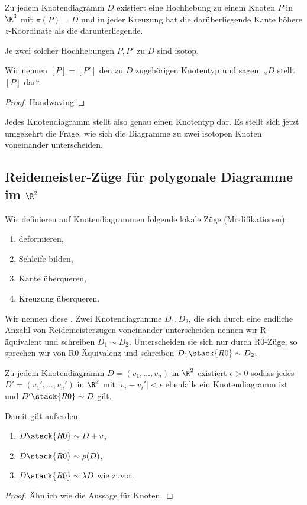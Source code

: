 \begin{lem}
    Zu jedem Knotendiagramm $D$ existiert eine Hochhebung zu einem Knoten $P$ in $\R^3$ mit $\pi(P) = D$ und in jeder Kreuzung hat die darüberliegende Kante höhere $z$-Koordinate als die darunterliegende.

    Je zwei solcher Hochhebungen $P, P'$ zu $D$ sind isotop.

    Wir nennen $[P] = [P']$ den zu $D$ zugehörigen Knotentyp und sagen: „$D$ stellt $[P]$ dar“.
    \begin{proof}
        Handwaving
    \end{proof}
\end{lem}

Jedes Knotendiagramm stellt also genau einen Knotentyp dar.
Es stellt sich jetzt umgekehrt die Frage, wie sich die Diagramme zu zwei isotopen Knoten voneinander unterscheiden.

\subsection{Reidemeister-Züge für polygonale Diagramme im \texorpdfstring{$\R^2$}{ℝ²}}

\begin{df}
    Wir definieren auf Knotendiagrammen folgende lokale Züge (Modifikationen):
    \begin{enumerate}[(R1),start=0,leftmargin=3em]
        \item deformieren,
        \item Schleife bilden,
        \item Kante überqueren,
        \item Kreuzung überqueren.
    \end{enumerate}
    Wir nennen diese .
    Zwei Knotendiagramme $D_1, D_2$, die sich durch eine endliche Anzahl von Reidemeisterzügen voneinander unterscheiden nennen wir R-äquivalent und schreiben $D_1 \sim D_2$.
    Unterscheiden sie sich nur durch R0-Züge, so sprechen wir von R0-Äquivalenz und schreiben $D_1 \stack{R0}\sim D_2$.
\end{df}

\begin{lem}
    Zu jedem Knotendiagramm $D = (v_1, \dotsc, v_n)$ in $\R^2$ existiert $\epsilon > 0$ sodass jedes $D' = (v_1', \dotsc, v_n')$ in $\R^2$ mit $|v_i - v_i'| < \epsilon$ ebenfalls ein Knotendiagramm ist und $D' \stack{R0}\sim D$ gilt.

    Damit gilt außerdem
    \begin{enumerate}[(1)]
        \item
            $D \stack{R0}\sim D + v$,
        \item
            $D \stack{R0}\sim \rho(D)$,
        \item
            $D \stack{R0}\sim \lambda D$ wie zuvor.
    \end{enumerate}
    \begin{proof}
        Ähnlich wie die Aussage für Knoten.
    \end{proof}
\end{lem}

